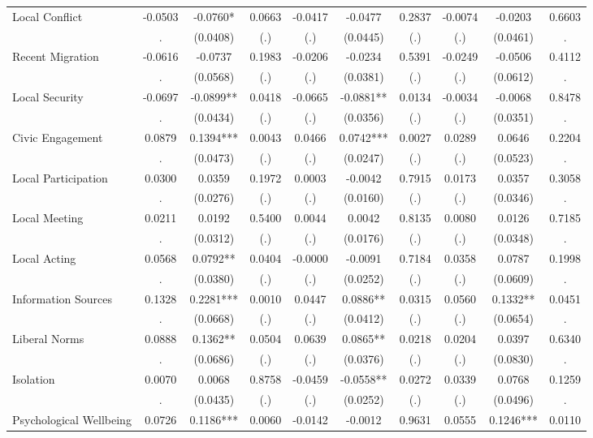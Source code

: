 \begin{tabular}{l*{9}{c}}
Local Conflict & -0.0503 & -0.0760* & 0.0663 & -0.0417 & -0.0477 & 0.2837 & -0.0074 & -0.0203 & 0.6603 \\
  & . & (0.0408) & (.) & (.) & (0.0445) & (.) & (.) & (0.0461) & . \\
Recent Migration & -0.0616 & -0.0737 & 0.1983 & -0.0206 & -0.0234 & 0.5391 & -0.0249 & -0.0506 & 0.4112 \\
  & . & (0.0568) & (.) & (.) & (0.0381) & (.) & (.) & (0.0612) & . \\
Local Security & -0.0697 & -0.0899** & 0.0418 & -0.0665 & -0.0881** & 0.0134 & -0.0034 & -0.0068 & 0.8478 \\
  & . & (0.0434) & (.) & (.) & (0.0356) & (.) & (.) & (0.0351) & . \\
Civic Engagement & 0.0879 & 0.1394*** & 0.0043 & 0.0466 & 0.0742*** & 0.0027 & 0.0289 & 0.0646 & 0.2204 \\
  & . & (0.0473) & (.) & (.) & (0.0247) & (.) & (.) & (0.0523) & . \\
Local Participation & 0.0300 & 0.0359 & 0.1972 & 0.0003 & -0.0042 & 0.7915 & 0.0173 & 0.0357 & 0.3058 \\
  & . & (0.0276) & (.) & (.) & (0.0160) & (.) & (.) & (0.0346) & . \\
Local Meeting & 0.0211 & 0.0192 & 0.5400 & 0.0044 & 0.0042 & 0.8135 & 0.0080 & 0.0126 & 0.7185 \\
  & . & (0.0312) & (.) & (.) & (0.0176) & (.) & (.) & (0.0348) & . \\
Local Acting & 0.0568 & 0.0792** & 0.0404 & -0.0000 & -0.0091 & 0.7184 & 0.0358 & 0.0787 & 0.1998 \\
  & . & (0.0380) & (.) & (.) & (0.0252) & (.) & (.) & (0.0609) & . \\
Information Sources & 0.1328 & 0.2281*** & 0.0010 & 0.0447 & 0.0886** & 0.0315 & 0.0560 & 0.1332** & 0.0451 \\
  & . & (0.0668) & (.) & (.) & (0.0412) & (.) & (.) & (0.0654) & . \\
Liberal Norms & 0.0888 & 0.1362** & 0.0504 & 0.0639 & 0.0865** & 0.0218 & 0.0204 & 0.0397 & 0.6340 \\
  & . & (0.0686) & (.) & (.) & (0.0376) & (.) & (.) & (0.0830) & . \\
Isolation & 0.0070 & 0.0068 & 0.8758 & -0.0459 & -0.0558** & 0.0272 & 0.0339 & 0.0768 & 0.1259 \\
  & . & (0.0435) & (.) & (.) & (0.0252) & (.) & (.) & (0.0496) & . \\
Psychological Wellbeing & 0.0726 & 0.1186*** & 0.0060 & -0.0142 & -0.0012 & 0.9631 & 0.0555 & 0.1246*** & 0.0110 \\

\end{tabular}

